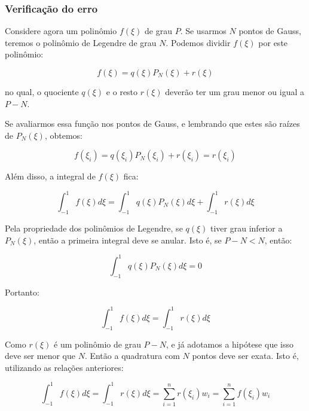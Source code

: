         \subsubsection*{Verificação do erro}

        Considere agora um polinômio $f(\xi)$ de grau $P$. Se usarmos $N$ pontos de Gauss, teremos o polinômio de Legendre de grau $N$. Podemos dividir $f(\xi)$ por este polinômio:

        \begin{equation}
            f(\xi) = q(\xi) P_N(\xi) + r(\xi)
        \end{equation}

        \noindent no qual, o quociente $q(\xi)$ e o resto $r(\xi)$ deverão ter um grau menor ou igual a $P-N$.

        Se avaliarmos essa função nos pontos de Gauss, e lembrando que estes são raízes de $P_N(\xi)$, obtemos:

        \begin{equation}
            f(\xi_i) = q(\xi_i)P_N(\xi_i) + r(\xi_i) = r(\xi_i)
        \end{equation}

        Além disso, a integral de $f(\xi)$ fica:

        \begin{equation}
            \int_{-1}^{1} f(\xi) d\xi = \int_{-1}^{1} q(\xi)P_N(\xi) d\xi + \int_{-1}^{1} r(\xi) d\xi
        \end{equation}

        Pela propriedade dos polinômios de Legendre, se $q(\xi)$ tiver grau inferior a $P_N(\xi)$, então a primeira integral deve se anular. Isto é, se $P-N < N$, então:

        \begin{equation}
            \int_{-1}^{1} q(\xi)P_N(\xi) d\xi = 0
        \end{equation}

        Portanto:

        \begin{equation}
            \int_{-1}^{1} f(\xi) d\xi = \int_{-1}^{1} r(\xi) d\xi
        \end{equation}

        Como $r(\xi)$ é um polinômio de grau $P-N$, e já adotamos a hipótese que isso deve ser menor que $N$. Então a quadratura com $N$ pontos deve ser exata. Isto é, utilizando as relações anteriores:

        \begin{equation}
            \int_{-1}^{1} f(\xi) d\xi = \int_{-1}^{1} r(\xi) d\xi = \sum_{i=1}^n r(\xi_i) w_i = \sum_{i=1}^n f(\xi_i) w_i 
        \end{equation}


